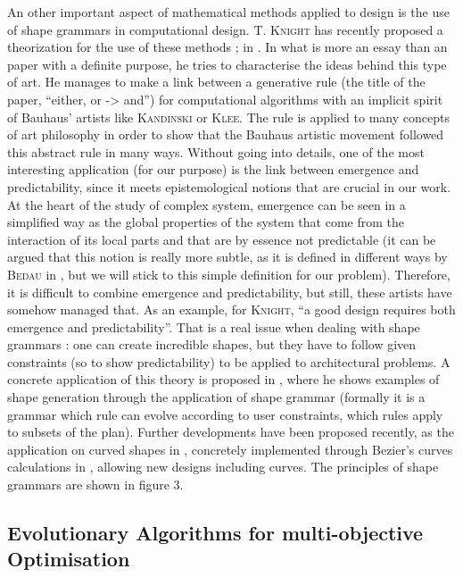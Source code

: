 \documentclass[english]{article}
\newcommand{\noun}[1]{\textsc{#1}}
\begin{document}
\bigskip{}


An other important aspect of mathematical methods applied to design
is the use of shape grammars in computational design. \noun{T. Knight}
has recently proposed a theorization for the use of these methods
; in \cite{knight2003either}. In what is more an essay than an
paper with a definite purpose, he tries to characterise the ideas behind this type of art.
He manages to make a link between a generative rule (the title of
the paper, ``either, or -> and'') for computational algorithms with
an implicit spirit of Bauhaus' artists like \noun{Kandinski} or \noun{Klee}.
The rule is applied to many concepts of art philosophy in order to
show that the Bauhaus artistic movement followed this abstract rule
in many ways. Without going into details, one of the most interesting
application (for our purpose) is the link between emergence and predictability,
since it meets epistemological notions that are crucial in our work.
At the heart of the study of complex system, emergence can be seen
in a simplified way as the global properties of the system that come
from the interaction of its local parts and that are by essence not
predictable (it can be argued that this notion is really more subtle,
as it is defined in different ways by \noun{Bedau} in \cite{bedau2002downward},
but we will stick to this simple definition for our problem). Therefore,
it is difficult to combine emergence and predictability, but still,
these artists have somehow managed that. As an example, for \noun{Knight}, ``a
good design requires both emergence and predictability''. That is
a real issue when dealing with shape grammars : one can create incredible
shapes, but they have to follow given constraints (so to show predictability)
to be applied to architectural problems. A concrete application of
this theory is proposed in \cite{knight2003computing}, where he shows
examples of shape generation through the application of shape grammar
(formally it is a grammar which rule can evolve according to user
constraints, which rules apply to subsets of the plan). Further developments
have been proposed recently, as the application on curved shapes in
\cite{jowers2010construction}, concretely implemented through Bezier's
curves calculations in \cite{jowers2011implementation}, allowing
new designs including curves. The principles of shape grammars are
shown in figure 3.


\subsection{Evolutionary Algorithms for multi-objective Optimisation}
\end{document}
